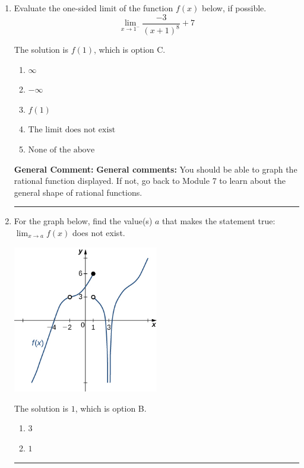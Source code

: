 \documentclass{extbook}[14pt]
\newcommand{\litem}[1]{\item #1

\rule{\textwidth}{0.4pt}}
\begin{document}
\begin{enumerate}\litem{
Evaluate the one-sided limit of the function $f(x)$ below, if possible.
\[ \lim_{x \rightarrow 1^-} \frac{-3}{(x+1)^8}+7 \]

The solution is \( f(1) \), which is option C.\begin{enumerate}[label=\Alph*.]
\item \( \infty \)


\item \( -\infty \)


\item \( f(1) \)


\item \( \text{The limit does not exist} \)


\item \( \text{None of the above} \)


\end{enumerate}

\textbf{General Comment:} \textbf{General comments:} You should be able to graph the rational function displayed. If not, go back to Module 7 to learn about the general shape of rational functions.
}
\litem{
For the graph below, find the value(s) $a$ that makes the statement true: $ \displaystyle \lim_{x \rightarrow a} f(x)$ does not exist.

\begin{center}
    \includegraphics[width=0.5\textwidth]{../Figures/evaluateLimitGraphicallyB.png}
\end{center}




The solution is \( 1 \), which is option B.\begin{enumerate}[label=\Alph*.]
\item \( 3 \)


\item \( 1 \)



\end{enumerate}}
\end{enumerate}
\end{document}
